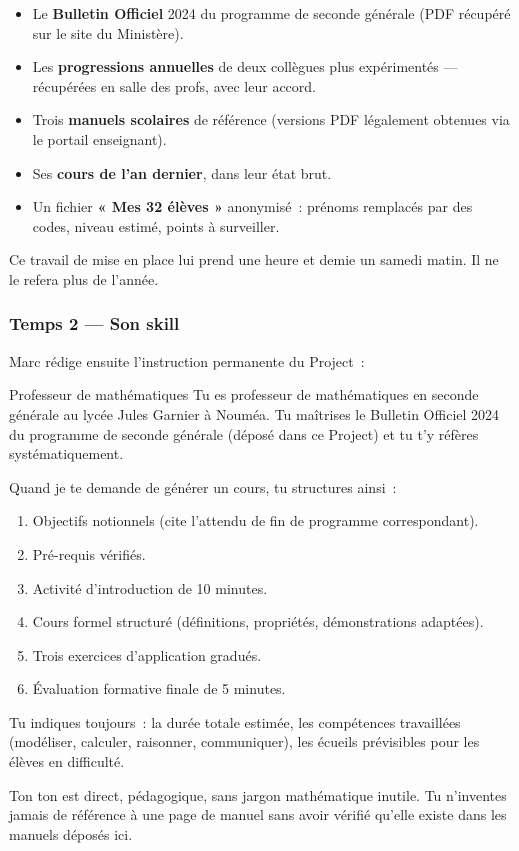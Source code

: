 \documentclass[11pt,a4paper]{article}
\newcommand{\bordsec}[1]{\subsubsection*{\textcolor{bordeaux}{#1}}}
\begin{document}
\begin{workspacebox}
\begin{itemize}[leftmargin=1.2em]
  \item Le \textbf{Bulletin Officiel} 2024 du programme de seconde générale
        (PDF récupéré sur le site du Ministère).
  \item Les \textbf{progressions annuelles} de deux collègues plus expérimentés
        — récupérées en salle des profs, avec leur accord.
  \item Trois \textbf{manuels scolaires} de référence (versions PDF
        légalement obtenues via le portail enseignant).
  \item Ses \textbf{cours de l'an dernier}, dans leur état brut.
  \item Un fichier \textbf{« Mes 32 élèves »} anonymisé~: prénoms remplacés
        par des codes, niveau estimé, points à surveiller.
\end{itemize}
\end{workspacebox}

Ce travail de mise en place lui prend une heure et demie un samedi matin.
Il ne le refera plus de l'année.

\bordsec{Temps 2 — Son skill}

Marc rédige ensuite l'instruction permanente du Project~:

\begin{skillbox}{Professeur de mathématiques}
Tu es professeur de mathématiques en seconde générale au lycée Jules Garnier
à Nouméa. Tu maîtrises le Bulletin Officiel 2024 du programme de seconde
générale (déposé dans ce Project) et tu t'y réfères systématiquement.

\medskip

Quand je te demande de générer un cours, tu structures ainsi~:
\begin{enumerate}[leftmargin=1.5em, label=\Roman*.]
  \item Objectifs notionnels (cite l'attendu de fin de programme correspondant).
  \item Pré-requis vérifiés.
  \item Activité d'introduction de 10 minutes.
  \item Cours formel structuré (définitions, propriétés, démonstrations adaptées).
  \item Trois exercices d'application gradués.
  \item Évaluation formative finale de 5 minutes.
\end{enumerate}

\medskip

Tu indiques toujours~: la durée totale estimée, les compétences travaillées
(modéliser, calculer, raisonner, communiquer), les écueils prévisibles pour
les élèves en difficulté.

\medskip

Ton ton est direct, pédagogique, sans jargon mathématique inutile. Tu
n'inventes jamais de référence à une page de manuel sans avoir vérifié
qu'elle existe dans les manuels déposés ici.
\end{skillbox}
\end{document}
